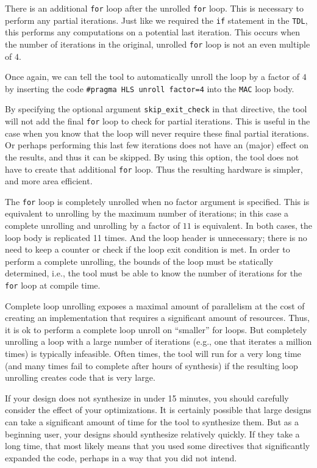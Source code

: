 There is an additional \lstinline{for} loop after the unrolled \lstinline{for} loop. This is necessary to perform any partial iterations. Just like we required the \lstinline{if} statement in the \lstinline{TDL}, this performs any computations on a potential last iteration. This occurs when the number of iterations in the original, unrolled \lstinline{for} loop is not an even multiple of $4$. 

Once again, we can tell the \VHLS tool to automatically unroll the loop by a factor of $4$ by inserting the code \lstinline{#pragma HLS unroll factor=4} into the \lstinline{MAC} loop body. 

By specifying the optional argument \lstinline{skip_exit_check} in that directive, the \VHLS tool will not add the final \lstinline{for} loop to check for partial iterations. This is useful in the case when you know that the loop will never require these final partial iterations. Or perhaps performing this last few iterations does not have an (major) effect on the results, and thus it can be skipped. By using this option, the \VHLS tool does not have to create that additional \lstinline{for} loop. Thus the resulting hardware is simpler, and more area efficient.

The \lstinline{for} loop is completely unrolled when no factor argument is specified. This is equivalent to unrolling by the maximum number of iterations; in this case a complete unrolling and unrolling by a factor of $11$ is equivalent. In both cases, the loop body is replicated 11 times. And the loop header is unnecessary; there is no need to keep a counter or check if the loop exit condition is met. In order to perform a complete unrolling, the bounds of the loop must be statically determined, i.e., the \VHLS tool must be able to know the number of iterations for the \lstinline{for} loop at compile time.

Complete loop unrolling exposes a maximal amount of parallelism at the cost of creating an implementation that requires a significant amount of resources. Thus, it is ok to perform a complete loop unroll on ``smaller'' for loops. But completely unrolling a loop with a large number of iterations (e.g., one that iterates a million times) is typically infeasible. Often times, the \VHLS tool will run for a very long time (and many times fail to complete after hours of synthesis) if the resulting loop unrolling creates code that is very large. 

\begin{aside}
If your design does not synthesize in under 15 minutes, you should carefully consider the effect of your optimizations. It is certainly possible that large designs can take a significant amount of time for the \VHLS tool to synthesize them. But as a beginning user, your designs should synthesize relatively quickly.  If they take a long time, that most likely means that you used some directives that significantly expanded the code, perhaps in a way that you did not intend.
\end{aside}


